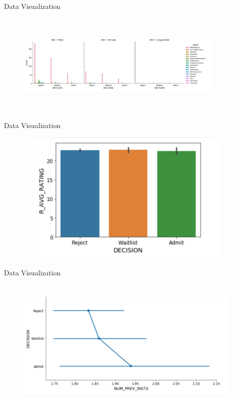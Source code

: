\documentclass[11pt]{beamer}
\begin{document}
\begin{frame}{Data Visualization}
	\vspace{-2mm}
	\begin{figure}
		\centering
		\includegraphics[width=10cm, height=5cm]{figure1c}
	\end{figure}		
\end{frame}

\begin{frame}{Data Visualization}
	\vspace{-2mm}
	\begin{figure}
		\centering
		\includegraphics[width=11cm, height=6.5cm]{figure1d}
	\end{figure}		
\end{frame}

\begin{frame}{Data Visualization}
	\vspace{-2mm}
	\begin{figure}
		\centering
		\includegraphics[width=11cm, height=6.5cm]{figure1e}
	\end{figure}		
\end{frame}
\end{document}
